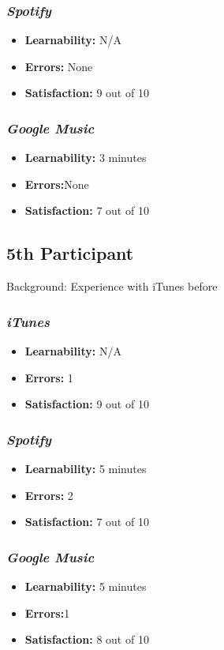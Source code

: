 \documentclass{article}
\begin{document}
\begin{multicols}{2}
\subsubsection{\it Spotify}
\begin{itemize}
	\item {\bf Learnability:} N/A
	\item {\bf Errors:} None
	\item {\bf Satisfaction:} 9 out of 10 
\end{itemize}

\subsubsection{\it Google Music}
\begin{itemize}
\item {\bf Learnability:} 3 minutes
	\item {\bf Errors:}None
	\item {\bf Satisfaction:} 7 out of 10 
\end{itemize}

\subsection{5th Participant}
Background: Experience with iTunes before

\subsubsection{\it iTunes}
\begin{itemize}
	\item {\bf Learnability:} N/A
	\item {\bf Errors:} 1
	\item {\bf Satisfaction:} 9 out of 10 
\end{itemize}

\subsubsection{\it Spotify}
\begin{itemize}
	\item {\bf Learnability:} 5 minutes
	\item {\bf Errors:} 2
	\item {\bf Satisfaction:} 7 out of 10 
\end{itemize}

\subsubsection{\it Google Music}
\begin{itemize}
\item {\bf Learnability:} 5 minutes
	\item {\bf Errors:}1
	\item {\bf Satisfaction:} 8 out of 10 
\end{itemize}  


\end{multicols}
\end{document}
